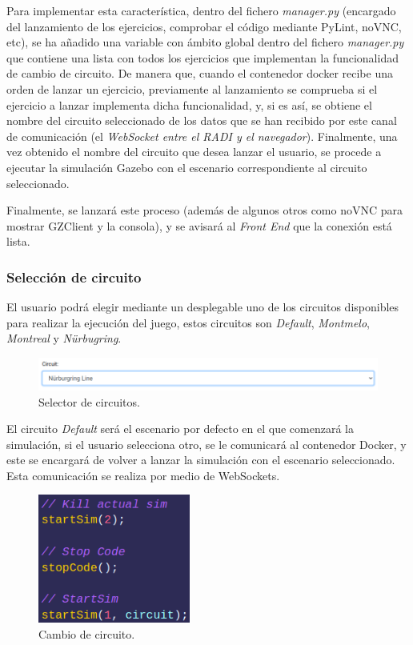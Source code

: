 \documentclass[a4paper, 12pt]{book}
\begin{document}
Para implementar esta característica, dentro del fichero \emph{manager.py} (encargado del lanzamiento de los ejercicios, comprobar el código mediante PyLint, noVNC, etc), se ha añadido una variable con ámbito global dentro del fichero \emph{manager.py} que contiene una lista con todos los ejercicios que implementan la funcionalidad de cambio de circuito. De manera que, cuando el contenedor docker recibe una orden de lanzar un ejercicio, previamente al lanzamiento se comprueba si el ejercicio a lanzar implementa dicha funcionalidad, y, si es así, se obtiene el nombre del circuito seleccionado de los datos que se han recibido por este canal de comunicación (el \emph{WebSocket entre el RADI y el navegador}). Finalmente, una vez obtenido el nombre del circuito que desea lanzar el usuario, se procede a ejecutar la simulación Gazebo con el escenario correspondiente al circuito seleccionado.

Finalmente, se lanzará este proceso (además de algunos otros como noVNC para mostrar GZClient y la consola), y se avisará al \emph{Front End} que la conexión está lista.

\subsubsection{Selección de circuito}
\label{subsec:follow_line_game_circuito}

El usuario podrá elegir mediante un desplegable uno de los circuitos disponibles para realizar la ejecución del juego, estos circuitos son \emph{Default}, \emph{Montmelo}, \emph{Montreal} y \emph{Nürbugring}. 

\begin{figure}[H]
	\centering
    \includegraphics[width=15cm]{img/circuit_selector.png}
    \caption{Selector de circuitos.}
    \label{figura:circuit_selector}
\end{figure}

El circuito \emph{Default} será el escenario por defecto en el que comenzará la simulación, si el usuario selecciona otro, se le comunicará al contenedor Docker, y este se encargará de volver a lanzar la simulación con el escenario seleccionado. Esta comunicación se realiza por medio de WebSockets.

\begin{figure}[H]
	\centering
    \includegraphics[width=5cm]{img/select_circuit_code.png}
    \caption{Cambio de circuito.}
    \label{figura:circuit_selector}
\end{figure}
\end{document}
